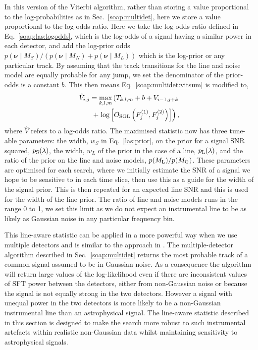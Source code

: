In this version of the Viterbi algorithm, rather than storing a value proportional to the log-probabilities as in Sec.~\ref{soap:multidet}, here we store a value proportional to the log-odds ratio.
Here we take the log-odds ratio defined in Eq.~\ref{soap:las:logodds}, which is the log-odds of a signal having a similar power in each detector, and add the log-prior odds $p(\bm{\nu} \mid M_S)/(p(\bm{\nu} \mid M_N) + p(\bm{\nu} \mid M_L))$ which is the log-prior or any particular track. By assuming that the track transitions for the line and noise model are equally probable for any jump, we set the denominator of the prior-odds is a constant $b$.
This then means Eq.~\ref{soap:multidet:vitsum} is modified to,
\begin{equation}
\begin{split}
\label{lineaware:stat}
\hat{V}_{i,j} = \max_{k,l,m}\left(T_{k,l,m} + b + V_{i-1,j+k}   \right. \\
 + \left.  \log\left[O_{\rm{SGL}}\left(F^{(1)}_{j},F^{(2)}_{j}\right)\right]\right),
\end{split}
\end{equation}
%
where $\hat{V}$ refers to a log-odds ratio.
The maximised statistic now has three tune-able parameters: the width, $w_S$ in Eq.~\ref{las:prior}, on the prior for a signal \gls{SNR} squared, $p_{\rm S}(\lambda)$, the width, $w_L$ of the prior in the case of a line, $p_{\rm L}(\lambda)$, and the ratio of the prior on the line and noise models, $p({M_{\rm L}})/p({M_{\rm G}})$.  These parameters are optimised for each search, where we initially estimate the \gls{SNR} of a signal we hope to be sensitive to in each time slice, then use this as a guide for the width of the signal prior. This is then repeated for an expected line \gls{SNR} and this is used for the width of the line prior. The ratio of line and noise models runs in the range 0 to 1, we set this limit as we do not expect an instrumental line to be as likely as Gaussian noise in any particular frequency bin.

%
%
This line-aware statistic can be applied in a more powerful way when we use multiple detectors and is similar to the approach in \citep{keitel2014SearchContinuousa}. The multiple-detector algorithm described in Sec.~\ref{soap:multidet} returns the most probable track of a common signal assumed to be in Gaussian noise. As a consequence the algorithm will return large values of the log-likelihood even if there are inconsistent values of \gls{SFT} power between the detectors, either from non-Gaussian noise or because the signal is not equally strong in the two detectors. However a signal with unequal power in the two detectors is more likely to be a non-Gaussian instrumental line than an astrophysical signal. The line-aware statistic described in this section is designed to make the search more robust to such instrumental artefacts within realistic non-Gaussian data whilst maintaining sensitivity to astrophysical signals.

